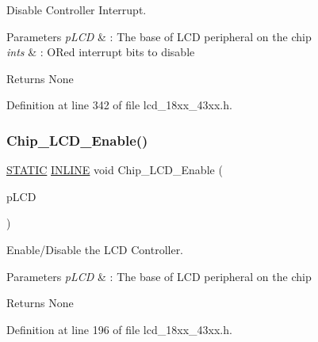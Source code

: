 Disable Controller Interrupt. 


\begin{DoxyParams}{Parameters}
{\em p\+L\+CD} & \+: The base of L\+CD peripheral on the chip \\
\hline
{\em ints} & \+: OR\textquotesingle{}ed interrupt bits to disable \\
\hline
\end{DoxyParams}
\begin{DoxyReturn}{Returns}
None 
\end{DoxyReturn}


Definition at line 342 of file lcd\+\_\+18xx\+\_\+43xx.\+h.

\mbox{\label{group___l_c_d__18_x_x__43_x_x_ga0828ea4978cdb0864d0f6bbfa7dcb49a}} 
\subsubsection{\texorpdfstring{Chip\+\_\+\+L\+C\+D\+\_\+\+Enable()}{Chip\_LCD\_Enable()}}
{\footnotesize\ttfamily \hyperlink{group___l_p_c___types___public___macros_ga10b2d890d871e1489bb02b7e70d9bdfb}{S\+T\+A\+T\+IC} \hyperlink{spifi__18xx__43xx_8h_a2eb6f9e0395b47b8d5e3eeae4fe0c116}{I\+N\+L\+I\+NE} void Chip\+\_\+\+L\+C\+D\+\_\+\+Enable (\begin{DoxyParamCaption}\item[{\hyperlink{struct_l_p_c___l_c_d___t}{L\+P\+C\+\_\+\+L\+C\+D\+\_\+T} $\ast$}]{p\+L\+CD }\end{DoxyParamCaption})}



Enable/\+Disable the L\+CD Controller. 


\begin{DoxyParams}{Parameters}
{\em p\+L\+CD} & \+: The base of L\+CD peripheral on the chip \\
\hline
\end{DoxyParams}
\begin{DoxyReturn}{Returns}
None 
\end{DoxyReturn}


Definition at line 196 of file lcd\+\_\+18xx\+\_\+43xx.\+h.

